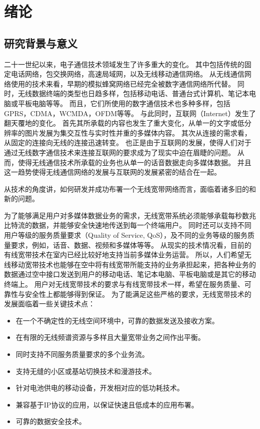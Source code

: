 \chapter{绪论}
\label{chap_preface}
\section{研究背景与意义}
\par  二十一世纪以来，电子通信技术领域发生了许多重大的变化。
其中包括传统的固定电话网络，包交换网络，高速局域网，以及无线移动通信网络。
从无线通信网络使用的技术来看，早期的模拟蜂窝网络已经完全被数字通信网络所代替。
同时，无线数据终端的类型也日趋多样，包括移动电话、普通台式计算机、笔记本电脑或平板电脑等等。
而且，它们所使用的数字通信技术也多种多样，包括GPRS，CDMA，WCMDA，OFDM等等。
与此同时，互联网（Internet）发生了翻天覆地的变化。
首先其所承载的内容也发生了重大变化，从单一的文字或低分辨率的图片发展为集交互性与实时性并重的多媒体内容。
其次从连接的需求看，从固定的连接向无线的连接迅速转变。
也正是由于互联网的发展，使得人们对于通过无线数字通信技术来连接互联网的要求成为了现实中迫在眉睫的问题。
从而，使得无线通信技术所承载的业务也从单一的话音数据走向多媒体数据。
并且这一趋势使得无线通信网络的发展与互联网的发展紧密的结合在一起。
\par 从技术的角度讲，如何研发并成功布署一个无线宽带网络而言，面临着诸多旧的和新的问题。
\par 为了能够满足用户对多媒体数据业务的需求，无线宽带系统必须能够承载每秒数兆比特流的数据，并能够安全快速地传送到每一个终端用户。
同时还可以支持不同用户等级的服务质量要求（Quality of Service, QoS），及不同的业务等级的服务质量要求，例如，话音、数据、视频和多媒体等等。
从现实的技术情况看，目前的有线宽带技术在室内已经比较好地支持当前多媒体业务运营。
所以，人们希望无线移动宽带技术也能够在空中将有线宽带所能支持的业务承担起来，把各种业务的数据通过空中接口发送到用户的移动电话、笔记本电脑、平板电脑或是其它的移动终端上。
用户对无线宽带技术的要求与有线宽带技术一样，希望在服务质量、可靠性与安全性上都能够得到保证。
为了能满足这些严格的要求，无线宽带技术的发展面临着一些关键技术点：
\begin{itemize}
\item   在一个不确定性的无线空间环境中，可靠的数据发送及接收方案。
\item   在有限的无线频谱资源与多样且大量宽带业务之间作出平衡。
\item   同时支持不同服务质量要求的多个业务流。
\item   支持无缝的小区或基站切换技术和漫游技术。
\item   针对电池供电的移动设备，开发相对应的低功耗技术。
\item   兼容基于IP协议的应用，以保证快速且低成本的应用布署。
\item   可靠的数据安全技术。
\end{itemize}

